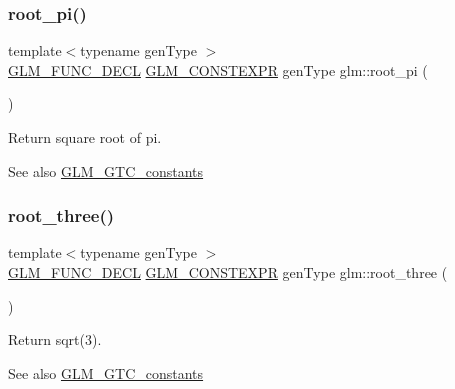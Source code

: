 \subsubsection{\texorpdfstring{root\+\_\+pi()}{root\_pi()}}
{\footnotesize\ttfamily template$<$typename gen\+Type $>$ \\
\mbox{\hyperlink{setup_8hpp_ab2d052de21a70539923e9bcbf6e83a51}{G\+L\+M\+\_\+\+F\+U\+N\+C\+\_\+\+D\+E\+CL}} \mbox{\hyperlink{setup_8hpp_a08b807947b47031d3a511f03f89645ad}{G\+L\+M\+\_\+\+C\+O\+N\+S\+T\+E\+X\+PR}} gen\+Type glm\+::root\+\_\+pi (\begin{DoxyParamCaption}{ }\end{DoxyParamCaption})}

Return square root of pi. \begin{DoxySeeAlso}{See also}
\mbox{\hyperlink{group__gtc__constants}{G\+L\+M\+\_\+\+G\+T\+C\+\_\+constants}} 
\end{DoxySeeAlso}
\mbox{\label{group__gtc__constants_ga4f286be4abe88be1eed7d2a9f6cb193e}} 
\subsubsection{\texorpdfstring{root\+\_\+three()}{root\_three()}}
{\footnotesize\ttfamily template$<$typename gen\+Type $>$ \\
\mbox{\hyperlink{setup_8hpp_ab2d052de21a70539923e9bcbf6e83a51}{G\+L\+M\+\_\+\+F\+U\+N\+C\+\_\+\+D\+E\+CL}} \mbox{\hyperlink{setup_8hpp_a08b807947b47031d3a511f03f89645ad}{G\+L\+M\+\_\+\+C\+O\+N\+S\+T\+E\+X\+PR}} gen\+Type glm\+::root\+\_\+three (\begin{DoxyParamCaption}{ }\end{DoxyParamCaption})}

Return sqrt(3). \begin{DoxySeeAlso}{See also}
\mbox{\hyperlink{group__gtc__constants}{G\+L\+M\+\_\+\+G\+T\+C\+\_\+constants}} 
\end{DoxySeeAlso}
\mbox{\label{group__gtc__constants_ga74e607d29020f100c0d0dc46ce2ca950}} 
